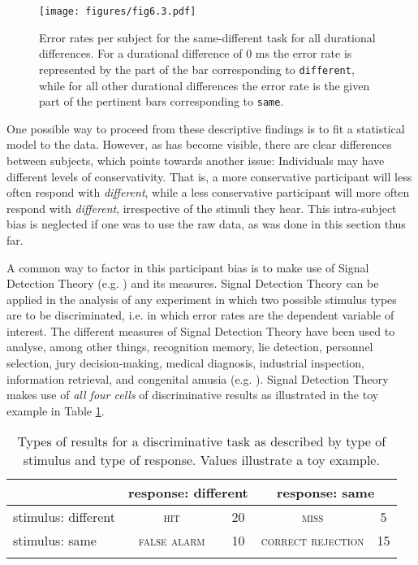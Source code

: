 \begin{figure}
    \centering
    \texttt{[image: figures/fig6.3.pdf]}
    \caption{Error rates per subject for the same-different task for all durational differences. For a durational difference of 0 ms the error rate is represented by the part of the bar corresponding to \texttt{different}, while for all other durational differences the error rate is the given part of the pertinent bars corresponding to \texttt{same}.}
    \label{fig:6_3}
\end{figure}

One possible way to proceed from these descriptive findings is to fit a statistical model to the data. However, as has become visible, there are clear differences between subjects, which points towards another issue: Individuals may have different levels of conservativity. That is, a more conservative participant will less often respond with \textit{different}, while a less conservative participant will more often respond with \textit{different}, irrespective of the stimuli they hear. This intra-subject bias is neglected if one was to use the raw data, as was done in this section thus far.

A common way to factor in this participant bias is to make use of Signal Detection Theory (e.g. \cite{Macmillan1993,Macmillan2005}) and its measures. Signal Detection Theory can be applied in the analysis of any experiment in which two possible stimulus types are to be discriminated, i.e. in which error rates are the dependent variable of interest. The different measures of Signal Detection Theory have been used to analyse, among other things, recognition memory, lie detection, personnel selection, jury decision-making, medical diagnosis, industrial inspection, information retrieval, and congenital amusia (e.g. \cite{Stanislaw1999, Pfeifer2018}). Signal Detection Theory makes use of \textit{all four cells} of discriminative results as illustrated in the toy example in Table \ref{tab:6.9}.

\begin{table}\fontsize{10}{11}
\caption{Types of results for a discriminative task as described by type of stimulus and type of response. Values illustrate a toy example.}
\label{tab:6.9}
\centering
\begin{tabular}{lcccc}
\lsptoprule
\textbf{~}          & \multicolumn{2}{c}{response: different} & \multicolumn{2}{c}{response: same}  \\
\midrule
stimulus: different & \textsc{hit}         & 20                        & \textsc{miss}              & 5               \\
stimulus: same      & \textsc{false alarm} & 10                        & \textsc{correct rejection} & 15              \\
\lspbottomrule
\end{tabular}
\end{table}

